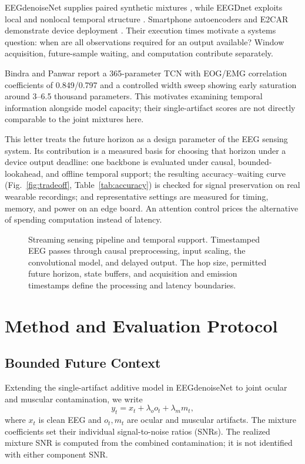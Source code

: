 \documentclass[letterpaper,journal]{IEEEtran}
\newcommand{\figblank}[1]{%
  \fbox{\parbox[c][#1][c]{\dimexpr\linewidth-2\fboxsep-2\fboxrule\relax}{\centering\color{gray}\small Figure reserved}}}
\begin{document}
EEGdenoiseNet supplies paired synthetic mixtures \cite{EEGdenoiseNet}, while EEGDnet exploits local and nonlocal temporal structure \cite{yi2022eegdnet}. Smartphone autoencoders and E2CAR demonstrate device deployment \cite{xing2024autoencoder,liu2026e2car}. Their execution times motivate a systems question: when are all observations required for an output available? Window acquisition, future-sample waiting, and computation contribute separately.

Bindra and Panwar \cite{bindra2026capacity} report a 365-parameter TCN with EOG/EMG correlation coefficients of 0.849/0.797 and a controlled width sweep showing early saturation around 3--6.5 thousand parameters. This motivates examining temporal information alongside model capacity; their single-artifact scores are not directly comparable to the joint mixtures here.

This letter treats the future horizon as a design parameter of the EEG sensing system. Its contribution is a measured basis for choosing that horizon under a device output deadline: one backbone is evaluated under causal, bounded-lookahead, and offline temporal support; the resulting accuracy--waiting curve (Fig.~\ref{fig:tradeoff}, Table~\ref{tab:accuracy}) is checked for signal preservation on real wearable recordings; and representative settings are measured for timing, memory, and power on an edge board. An attention control prices the alternative of spending computation instead of latency.

\begin{figure}[t]
\centering
\figblank{24mm}
\caption{Streaming sensing pipeline and temporal support. Timestamped EEG passes through causal preprocessing, input scaling, the convolutional model, and delayed output. The hop size, permitted future horizon, state buffers, and acquisition and emission timestamps define the processing and latency boundaries.}
\label{fig:pipeline}
\end{figure}

\section{Method and Evaluation Protocol}
\subsection{Bounded Future Context}
Extending the single-artifact additive model in EEGdenoiseNet \cite{EEGdenoiseNet} to joint ocular and muscular contamination, we write
\begin{equation}
 y_t=x_t+\lambda_o o_t+\lambda_m m_t,
 \label{eq:mixture}
\end{equation}
where $x_t$ is clean EEG and $o_t,m_t$ are ocular and muscular artifacts. The mixture coefficients set their individual signal-to-noise ratios (SNRs). The realized mixture SNR is computed from the combined contamination; it is not identified with either component SNR.
\end{document}
